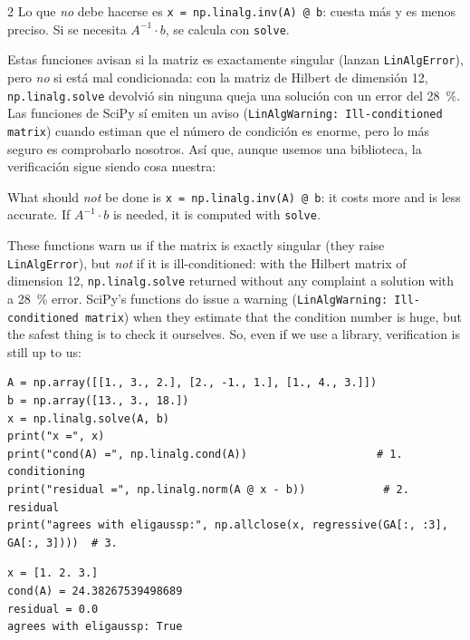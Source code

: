 \begin{paracol}{2}
\switchcolumn
Lo que \emph{no} debe hacerse es \texttt{x = np.linalg.inv(A) @ b}: cuesta más y es menos preciso. Si se necesita $A^{-1}\cdot b$, se calcula con \texttt{solve}.

Estas funciones avisan si la matriz es exactamente singular (lanzan \texttt{LinAlgError}), pero \emph{no} si está mal condicionada: con la matriz de Hilbert de dimensión 12, \texttt{np.linalg.solve} devolvió sin ninguna queja una solución con un error del 28~\%. Las funciones de SciPy sí emiten un aviso (\texttt{LinAlgWarning: Ill-conditioned matrix}) cuando estiman que el número de condición es enorme, pero lo más seguro es comprobarlo nosotros. Así que, aunque usemos una biblioteca, la verificación sigue siendo cosa nuestra:

\switchcolumn
What should \emph{not} be done is \texttt{x = np.linalg.inv(A) @ b}: it costs more and is less accurate. If $A^{-1}\cdot b$ is needed, it is computed with \texttt{solve}.

These functions warn us if the matrix is exactly singular (they raise \texttt{LinAlgError}), but \emph{not} if it is ill-conditioned: with the Hilbert matrix of dimension 12, \texttt{np.linalg.solve} returned without any complaint a solution with a 28~\% error. SciPy's functions do issue a warning (\texttt{LinAlgWarning: Ill-conditioned matrix}) when they estimate that the condition number is huge, but the safest thing is to check it ourselves. So, even if we use a library, verification is still up to us:
\end{paracol}

\begin{verbatim}
A = np.array([[1., 3., 2.], [2., -1., 1.], [1., 4., 3.]])
b = np.array([13., 3., 18.])
x = np.linalg.solve(A, b)
print("x =", x)
print("cond(A) =", np.linalg.cond(A))                    # 1. conditioning
print("residual =", np.linalg.norm(A @ x - b))            # 2. residual
print("agrees with eligaussp:", np.allclose(x, regressive(GA[:, :3], GA[:, 3])))  # 3.
\end{verbatim}
\begin{verbatim}
x = [1. 2. 3.]
cond(A) = 24.38267539498689
residual = 0.0
agrees with eligaussp: True
\end{verbatim}

